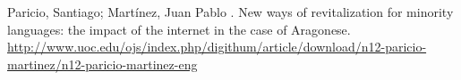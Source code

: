 \documentclass[10pt, a4paper]{article}
\begin{document}
\begin{thebibliography}{}
  Paricio, Santiago; Martínez, Juan Pablo
  . 
  \newblock New ways of revitalization for minority languages: the impact of the internet in the case of Aragonese.
  \url{http://www.uoc.edu/ojs/index.php/digithum/article/download/n12-paricio-martinez/n12-paricio-martinez-eng}



 
\end{thebibliography}
  
\end{document}
